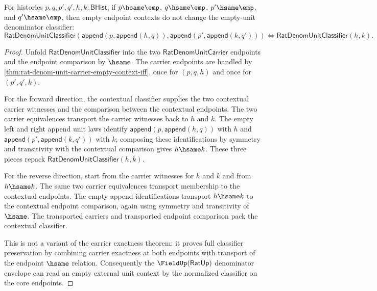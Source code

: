 \begin{theorem}
\label{thm:rat-denom-unit-classifier-empty-context-iff}
\label{thm:field-rat-denominator-unit-classifier-empty-context-exactness}
For histories $p,q,p',q',h,k:\mathsf{BHist}$, if
$p\hsame\emp$, $q\hsame\emp$, $p'\hsame\emp$, and $q'\hsame\emp$, then
empty endpoint contexts do not change the empty-unit denominator classifier:
$$
\mathsf{RatDenomUnitClassifier}(\mathsf{append}(p,\mathsf{append}(h,q)),
\mathsf{append}(p',\mathsf{append}(k,q')))
\Longleftrightarrow
\mathsf{RatDenomUnitClassifier}(h,k).
$$
\end{theorem}
\begin{proof}
Unfold $\mathsf{RatDenomUnitClassifier}$ into the two
$\mathsf{RatDenomUnitCarrier}$ endpoints and the endpoint comparison by
$\hsame$. The carrier endpoints are handled by
\autoref{thm:rat-denom-unit-carrier-empty-context-iff}, once for
$(p,q,h)$ and once for $(p',q',k)$.

For the forward direction, the contextual classifier supplies the two
contextual carrier witnesses and the comparison between the contextual
endpoints. The two carrier equivalences transport the carrier witnesses back
to $h$ and $k$. The empty left and right append unit laws identify
$\mathsf{append}(p,\mathsf{append}(h,q))$ with $h$ and
$\mathsf{append}(p',\mathsf{append}(k,q'))$ with $k$; composing these
identifications by symmetry and transitivity with the contextual comparison
gives $h\hsame k$. These three pieces repack
$\mathsf{RatDenomUnitClassifier}(h,k)$.

For the reverse direction, start from the carrier witnesses for $h$ and $k$
and from $h\hsame k$. The same two carrier equivalences transport membership
to the contextual endpoints. The empty append identifications transport
$h\hsame k$ to the contextual endpoint comparison, again using symmetry and
transitivity of $\hsame$. The transported carriers and transported endpoint
comparison pack the contextual classifier.

This is not a variant of the carrier exactness theorem: it proves full
classifier preservation by combining carrier exactness at both endpoints with
transport of the endpoint $\hsame$ relation. Consequently the
$\FieldUp(\mathsf{RatUp})$ denominator envelope can read an empty external
unit context by the normalized classifier on the core endpoints.
\end{proof}

